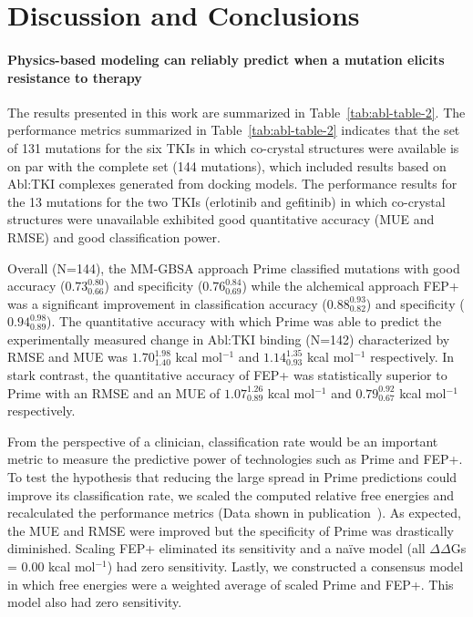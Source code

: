 \documentclass[phd,tocprelim]{cornell}
\begin{document}
\section{Discussion and Conclusions}

\paragraph{Physics-based modeling can reliably predict when a mutation elicits resistance to therapy}

The results presented in this work are summarized in Table~\ref{tab:abl-table-2}.
The performance metrics summarized in Table~\ref{tab:abl-table-2} indicates that the set of 131 mutations for the six TKIs in which co-crystal structures were available is on par with the complete set (144 mutations), which included results based on Abl:TKI complexes generated from docking models.
The performance results for the 13 mutations for the two TKIs (erlotinib and gefitinib) in which co-crystal structures were unavailable exhibited good quantitative accuracy (MUE and RMSE) and good classification power.    

Overall (N=144), the MM-GBSA approach Prime classified mutations with good accuracy ($0.73^{0.80}_{0.66}$) and specificity ($0.76^{0.84}_{0.69}$)
while the alchemical approach FEP+ was a significant improvement in classification accuracy ($0.88^{0.93}_{0.82}$) and specificity ($0.94^{0.98}_{0.89}$).
The quantitative accuracy with which Prime was able to predict the experimentally measured change in Abl:TKI binding (N=142) characterized by RMSE and MUE was $1.70^{1.98}_{1.40}$ kcal mol$^{-1}$ and $1.14^{1.35}_{0.93}$ kcal mol$^{-1}$ respectively.
In stark contrast, the quantitative accuracy of FEP+ was statistically superior to Prime with an RMSE and an MUE of $1.07^{1.26}_{0.89}$ kcal mol$^{-1}$ and $0.79^{0.92}_{0.67}$ kcal mol$^{-1}$ respectively.

From the perspective of a clinician, classification rate would be an important metric to measure the predictive power of technologies such as Prime and FEP+. To test the hypothesis that reducing the large spread in Prime predictions could improve its classification rate, we scaled the computed relative free energies %
and recalculated the performance metrics (Data shown in publication~\citep{Hauser:2018vz}). As expected, the MUE and RMSE were improved but the specificity of Prime was drastically diminished. %
Scaling FEP+ eliminated its sensitivity and a na{\"i}ve model (all $\Delta\Delta$Gs = 0.00 kcal mol$^{-1}$) had zero sensitivity. Lastly, we constructed a consensus model in which free energies were a weighted average of scaled Prime and FEP+. This model also had zero sensitivity. %
\end{document}
